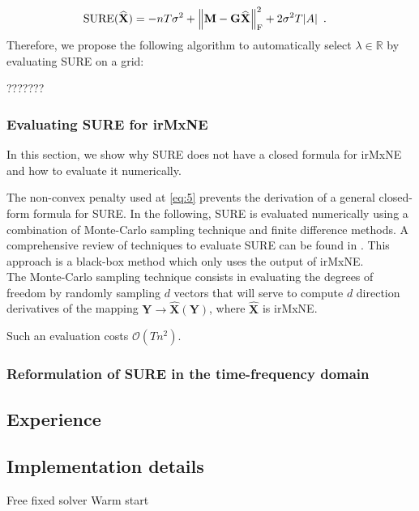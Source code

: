 \begin{align*}
    \text{SURE}(\widehat{\mathbf{X}})
    &= -nT\sigma^2 + \left \lVert 
        \mathbf{M} - \mathbf{G}\widehat{\mathbf{X}}
     \right \rVert_{\text{F}}^2
    + 2 \sigma^2 T \lvert A \rvert
    \enspace .
\end{align*}
%
Therefore, we propose the following algorithm to automatically select $\lambda \in \mathbb{R}$ by evaluating SURE on 
a grid:

???????

\subsubsection{Evaluating SURE for irMxNE}

In this section, we show why SURE does not have a closed formula for irMxNE and how to evaluate it numerically. 

The non-convex penalty used at \eqref{eq:5} prevents the derivation of a general closed-form formula for SURE. In the following, 
SURE is evaluated numerically using a combination of Monte-Carlo sampling technique and finite difference methods. 
A comprehensive review of techniques to evaluate SURE can be found in \cite{Deledalle_Vaiter_Fadili_Peyre14}. This approach is a black-box
method which only uses the output of irMxNE.
\\
The Monte-Carlo sampling technique consists in evaluating the degrees of freedom by randomly sampling $d$ vectors that will 
serve to compute $d$ direction derivatives of the mapping $\mathbf{Y} \rightarrow \widehat{\mathbf{X}}(\mathbf{Y})$, where 
$\widehat{\mathbf{X}}$ is irMxNE.




Such an evaluation costs $\mathcal{O}(Tn^2)$.

\subsubsection{Reformulation of SURE in the time-frequency domain}


\subsection{Experience}
\label{sub:experience}
%

\subsection{Implementation details}
\label{sub:experience}
%
Free fixed solver
Warm start

\clearpage
